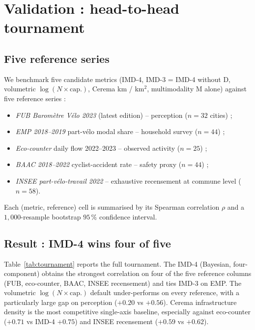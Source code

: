 \documentclass[11pt,a4paper]{article}
\begin{document}
\section{Validation : head-to-head tournament}
\label{sec:tournament}

\subsection{Five reference series}

We benchmark five candidate metrics
(IMD-4, IMD-3 = IMD-4 without D, volumetric $\log(N \times \text{cap.})$,
Cerema km / km$^2$, multimodality M alone)
against five reference series :

\begin{itemize}[label=$\bullet$,leftmargin=*]
    \item \emph{FUB Barom\`etre V\'elo 2023} (latest edition) --
          perception ($n=32$ cities) ;
    \item \emph{EMP 2018--2019} part-v\'elo modal share --
          household survey ($n=44$) ;
    \item \emph{Eco-counter} daily flow 2022--2023 -- observed
          activity ($n=25$) ;
    \item \emph{BAAC 2018--2022} cyclist-accident rate -- safety
          proxy \citep{Reynolds2009,Schepers2014} ($n=44$) ;
    \item \emph{INSEE part-v\'elo-travail 2022} -- exhaustive
          recensement at commune level ($n=58$).
\end{itemize}

Each (metric, reference) cell is summarised by its Spearman
correlation $\rho$ and a $1{,}000$-resample bootstrap $95\,\%$
confidence interval.

\subsection{Result : IMD-4 wins four of five}

Table~\ref{tab:tournament} reports the full tournament.
The IMD-4 (Bayesian, four-component) obtains the strongest
correlation on four of the five reference columns (FUB,
eco-counter, BAAC, INSEE recensement) and ties IMD-3 on EMP.
The volumetric $\log(N \times \text{cap.})$ default
under-performs on every reference, with a particularly large gap
on perception ($+0.20$ vs $+0.56$).  Cerema infrastructure
density is the most competitive single-axis baseline, especially
against eco-counter ($+0.71$ vs IMD-4 $+0.75$) and INSEE recensement
($+0.59$ vs $+0.62$).
\end{document}
